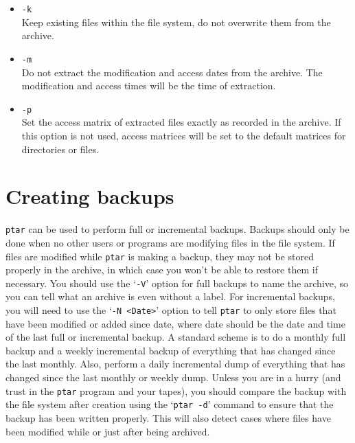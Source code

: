\begin{itemize}

  \item {\tt -k} \\
        Keep existing files within the file system, do not overwrite them from 
        the archive.

  \item {\tt -m} \\
        Do not extract the modification and access dates from the archive. The 
        modification and access times will be the time of extraction.

  \item {\tt -p} \\
        Set the access matrix of extracted files exactly as recorded in the 
        archive. If this option is not used, access matrices will be set to 
        the default matrices for directories or files.

\end{itemize}

\section{Creating backups}

{\tt ptar} can be used to perform full or incremental backups. Backups should 
only be done when no other users or programs are modifying files in the 
file system. If files are modified while {\tt ptar} is making a backup, they 
may not be stored properly in the archive, in which case you won't be able to 
restore them if necessary. You should use the `{\tt -V}' option for full
backups to name the archive, so you can tell what an archive is even without
a label. For incremental backups, you will need to use the `{\tt -N <Date>}'
option to tell {\tt ptar} to only store files that have been modified or added 
since date, where date should be the date and time of the last full or 
incremental backup. A standard scheme is to do a monthly full backup and a 
weekly incremental backup of everything that has changed since the last 
monthly. Also, perform  a daily incremental dump of everything that has 
changed since the last monthly or weekly dump. Unless you are in a hurry (and 
trust in the {\tt ptar} program and your tapes), you should compare the backup 
with the file system after creation using the `{\tt ptar -d}' command to ensure
that the backup has been written properly. This will also detect cases where 
files have been modified while or just after being archived.
